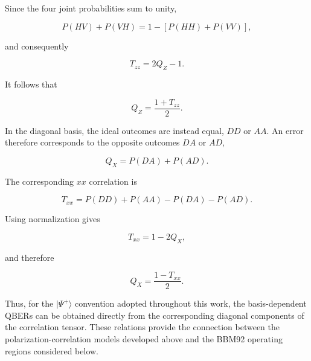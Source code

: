 Since the four joint probabilities sum to unity,

\begin{equation}
P(HV)+P(VH)
=
1-
\left[
P(HH)+P(VV)
\right],
\end{equation}

and consequently

\begin{equation}
T_{zz}
=
2Q_Z-1.
\end{equation}

It follows that

\begin{equation}
\boxed{
Q_Z
=
\frac{1+T_{zz}}{2}.
}
\label{eq:bbm92_qber_z_from_correlation}
\end{equation}

In the diagonal basis, the ideal outcomes are instead equal, \(DD\) or \(AA\).
An error therefore corresponds to the opposite outcomes \(DA\) or \(AD\),

\begin{equation}
Q_X
=
P(DA)+P(AD).
\label{eq:qber_x_probabilities}
\end{equation}

The corresponding \(xx\) correlation is

\begin{equation}
T_{xx}
=
P(DD)+P(AA)-P(DA)-P(AD).
\label{eq:txx_joint_probabilities}
\end{equation}

Using normalization gives

\begin{equation}
T_{xx}
=
1-2Q_X,
\end{equation}

and therefore

\begin{equation}
\boxed{
Q_X
=
\frac{1-T_{xx}}{2}.
}
\label{eq:bbm92_qber_x_from_correlation}
\end{equation}

Thus, for the \( |\Psi^+\rangle \) convention adopted throughout this work, the
basis-dependent QBERs can be obtained directly from the corresponding diagonal
components of the correlation tensor. These relations provide the connection
between the polarization-correlation models developed above and the BBM92
operating regions considered below.


